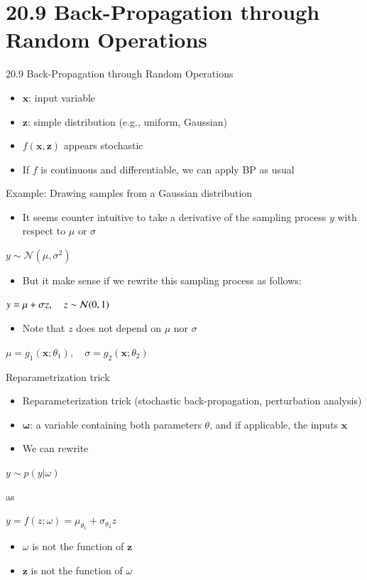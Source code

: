 \documentclass[dvipdfmx,presentation]{beamer}
\def\bf{\mathbf}
\begin{document}
\section{20.9 Back-Propagation through Random Operations}
\label{sec:orgheadline11}
\begin{frame}[label={sec:orgheadline8}]{20.9 Back-Propagation through Random Operations}
\begin{itemize}
\item \(\bf{x}\): input variable
\item \(\bf{z}\): simple distribution (e.g., uniform, Gaussian)
\item \(f(\bf{x}, \bf{z})\) appears stochastic
\item If \(f\) is continuous and differentiable, we can apply BP as usual
\end{itemize}
\end{frame}

\begin{frame}[label={sec:orgheadline9}]{Example: Drawing samples from a Gaussian distribution}
\begin{itemize}
\item It seems counter intuitive to take a derivative of the sampling process \(y\) with respect to \(\mu\) or \(\sigma\)
\end{itemize}

\centering
\(y \sim \mathcal{N}(\mu, \sigma^{2})\)
\begin{itemize}
\item But it make sense if we rewrite this sampling process as follows:
\end{itemize}
\centering
\(y = \mu + \sigma z$, $\quad z \sim \mathcal{N}(0, 1)\)
\begin{itemize}
\item Note that \(z\) does not depend on \(\mu\) nor \(\sigma\)
\end{itemize}
\centering
\(\mu = g_{1}(\bf{x}; \theta_{1}), \quad \sigma = g_{2}(\bf{x}; \theta_{2})\)
\end{frame}

\begin{frame}[label={sec:orgheadline10}]{Reparametrization trick}
\begin{itemize}
\item Reparameterization trick (stochastic back-propagation, perturbation analysis)
\item \(\bf{\omega}\): a variable containing both parameters \(\theta\), and if applicable, the inputs \(\bf{x}\)
\item We can rewrite
\end{itemize}
\centering
\(y \sim p(y | \omega)\)

as

\(y = f(z; \omega) = \mu_{\theta_{1}} + \sigma_{\theta_{2}} z\)
\begin{itemize}
\item \(\omega\) is not the function of \(\bf{z}\)
\item \(\bf{z}\) is not the function of \(\omega\)
\end{itemize}
\end{frame}
\end{document}
